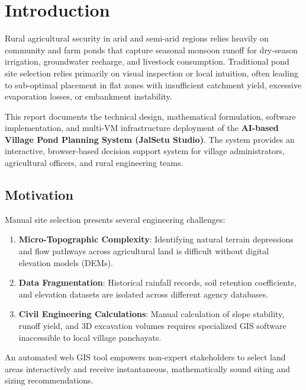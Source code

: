 \documentclass[manuscript,screen]{acmart}
\begin{document}
\section{Introduction}
\label{sec:intro}
Rural agricultural security in arid and semi-arid regions relies heavily on community and farm ponds that capture seasonal monsoon runoff for dry-season irrigation, groundwater recharge, and livestock consumption. Traditional pond site selection relies primarily on visual inspection or local intuition, often leading to sub-optimal placement in flat zones with insufficient catchment yield, excessive evaporation losses, or embankment instability.

This report documents the technical design, mathematical formulation, software implementation, and multi-VM infrastructure deployment of the \textbf{AI-based Village Pond Planning System (JalSetu Studio)}. The system provides an interactive, browser-based decision support system for village administrators, agricultural officers, and rural engineering teams.

\subsection{Motivation}
Manual site selection presents several engineering challenges:
\begin{enumerate}[leftmargin=*]
    \item \textbf{Micro-Topographic Complexity}: Identifying natural terrain depressions and flow pathways across agricultural land is difficult without digital elevation models (DEMs).
    \item \textbf{Data Fragmentation}: Historical rainfall records, soil retention coefficients, and elevation datasets are isolated across different agency databases.
    \item \textbf{Civil Engineering Calculations}: Manual calculation of slope stability, runoff yield, and 3D excavation volumes requires specialized GIS software inaccessible to local village panchayats.
\end{enumerate}
An automated web GIS tool empowers non-expert stakeholders to select land areas interactively and receive instantaneous, mathematically sound siting and sizing recommendations.
\end{document}
